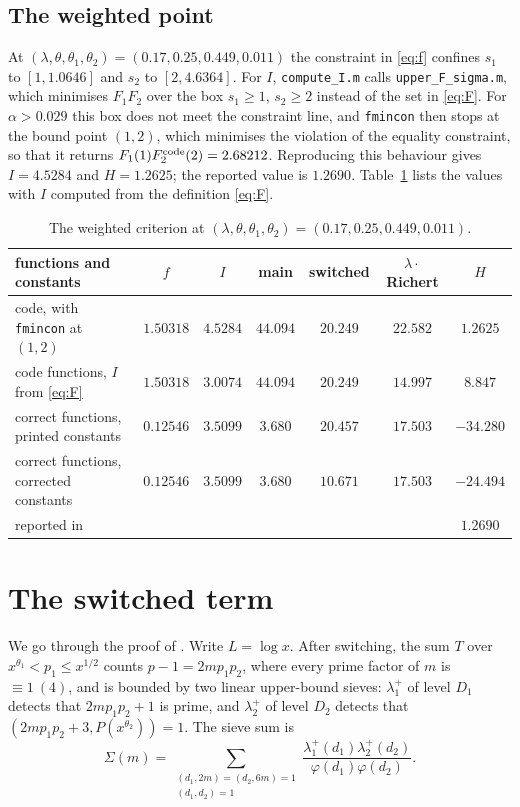 \documentclass[11pt,a4paper]{amsart}
\theoremstyle{remark}
\numberwithin{equation}{section}
\begin{document}
\subsection{The weighted point}
At $(\lambda,\theta,\theta_1,\theta_2)=(0.17,0.25,0.449,0.011)$ the constraint in \eqref{eq:f} confines $s_1$ to
$[1,1.0646]$ and $s_2$ to $[2,4.6364]$. For $I$, \texttt{compute\_I.m} calls \texttt{upper\_F\_sigma.m}, which
minimises $F_1F_2$ over the box $s_1\ge1$, $s_2\ge2$ instead of the set in \eqref{eq:F}. For $\alpha>0.029$ this box
does not meet the constraint line, and \texttt{fmincon} then stops at the bound point $(1,2)$, which minimises the
violation of the equality constraint, so that it returns $F_1(1)F_2^{\rm code}(2)=2.68212$. Reproducing this
behaviour gives $I=4.5284$ and $H=1.2625$; the reported value is $1.2690$. Table~\ref{tab:H} lists the values with
$I$ computed from the definition \eqref{eq:F}.

\begin{table}[htbp]
\centering\small
\begin{tabular}{lcccccc}
\toprule
functions and constants & $f$ & $I$ & main & switched & $\lambda\cdot$Richert & $H$\\
\midrule
code, with \texttt{fmincon} at $(1,2)$ & $1.50318$ & $4.5284$ & $44.094$ & $20.249$ & $22.582$ & $1.2625$\\
code functions, $I$ from \eqref{eq:F} & $1.50318$ & $3.0074$ & $44.094$ & $20.249$ & $14.997$ & $8.847$\\
correct functions, printed constants & $0.12546$ & $3.5099$ & $3.680$ & $20.457$ & $17.503$ & $-34.280$\\
correct functions, corrected constants & $0.12546$ & $3.5099$ & $3.680$ & $10.671$ & $17.503$ & $-24.494$\\
\midrule
reported in \cite[\S5]{NX} & & & & & & $1.2690$\\
\bottomrule
\end{tabular}
\caption{The weighted criterion at $(\lambda,\theta,\theta_1,\theta_2)=(0.17,0.25,0.449,0.011)$.}
\label{tab:H}
\end{table}

\section{The switched term}\label{sec:constants}

We go through the proof of \cite[Proposition~4.2]{NX}. Write $L=\log x$. After switching, the sum $T$ over
$x^{\theta_1}<p_1\le x^{1/2}$ counts $p-1=2mp_1p_2$, where every prime factor of $m$ is $\equiv1\ (4)$, and is
bounded by two linear upper-bound sieves: $\lambda_1^+$ of level $D_1$ detects that $2mp_1p_2+1$ is prime, and
$\lambda_2^+$ of level $D_2$ detects that $(2mp_1p_2+3,P(x^{\theta_2}))=1$. The sieve sum is
\begin{equation}\label{eq:sieve-sum}
\Sigma(m)=\sum_{\substack{(d_1,2m)=(d_2,6m)=1\\(d_1,d_2)=1}}\frac{\lambda_1^+(d_1)\lambda_2^+(d_2)}{\varphi(d_1)\varphi(d_2)} .
\end{equation}
\end{document}

